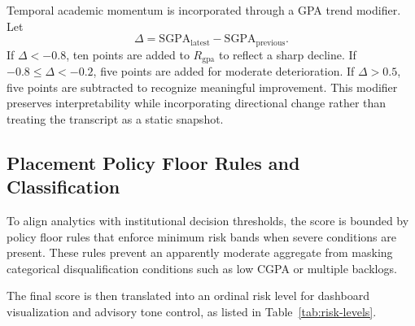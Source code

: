 \documentclass[conference]{IEEEtran}
\begin{document}
Temporal academic momentum is incorporated through a GPA trend modifier. Let
\begin{equation}
\Delta = \mathrm{SGPA}_{\mathrm{latest}} - \mathrm{SGPA}_{\mathrm{previous}}.
\end{equation}
If $\Delta < -0.8$, ten points are added to $R_{\mathrm{gpa}}$ to reflect a sharp decline. If $-0.8 \leq \Delta < -0.2$, five points are added for moderate deterioration. If $\Delta > 0.5$, five points are subtracted to recognize meaningful improvement. This modifier preserves interpretability while incorporating directional change rather than treating the transcript as a static snapshot.

\subsection{Placement Policy Floor Rules and Classification}
To align analytics with institutional decision thresholds, the score is bounded by policy floor rules that enforce minimum risk bands when severe conditions are present. These rules prevent an apparently moderate aggregate from masking categorical disqualification conditions such as low CGPA or multiple backlogs.

\begin{table}[t]
\caption{Placement Policy Floor Rules}
\label{tab:floor-rules}
\centering
{}
\end{table}

The final score is then translated into an ordinal risk level for dashboard visualization and advisory tone control, as listed in Table~\ref{tab:risk-levels}.

\begin{table}[t]
\caption{SARS Risk Level Classification}
\label{tab:risk-levels}
\centering
{}
\end{table}
\end{document}

